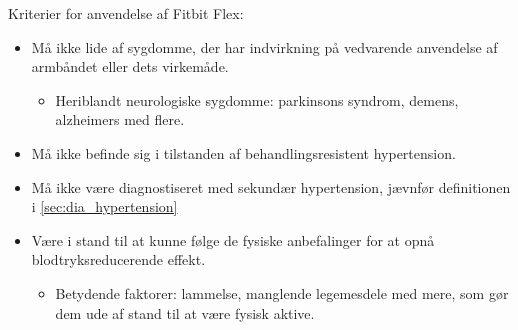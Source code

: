 Kriterier for anvendelse af Fitbit Flex:
\begin{itemize}
\item Må ikke lide af sygdomme, der har indvirkning på vedvarende anvendelse af armbåndet eller dets virkemåde. 
	\begin{itemize}
	\item Heriblandt neurologiske sygdomme: parkinsons syndrom, demens, alzheimers med flere.
	\end{itemize}

\item Må ikke befinde sig i tilstanden af behandlingsresistent hypertension. 

\item Må ikke være diagnostiseret med sekundær hypertension, jævnfør definitionen i \autoref{sec:dia_hypertension} %

\item Være i stand til at kunne følge de fysiske anbefalinger for at opnå blodtryksreducerende effekt. 
	\begin{itemize}
	\item Betydende faktorer: lammelse, manglende legemesdele med mere, som gør dem ude af stand til at være fysisk aktive. 
	\end{itemize}  

\end{itemize}




